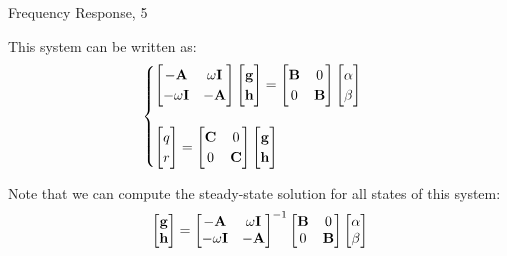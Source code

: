 \documentclass{beamer}
\begin{document}
\begin{frame}{Frequency Response, 5}
	\begin{flushleft}
		
		This system can be written as:
		\begin{align}
			\begin{cases}
				\begin{bmatrix}
					-\mathbf{A} & \omega \mathbf{I} \\
					-\omega \mathbf{I} & -\mathbf{A}
				\end{bmatrix}
				\begin{bmatrix}
					\mathbf{g} \\ \mathbf{h}
				\end{bmatrix}
				=
				\begin{bmatrix}
					\mathbf{B} & 0 \\  0 & \mathbf{B}
				\end{bmatrix}
				\begin{bmatrix}
				\alpha \\   \beta
				\end{bmatrix}
				\\
				\\
				\begin{bmatrix}
					q \\  r
				\end{bmatrix}
				= 
				\begin{bmatrix}
					\mathbf{C} & 0 \\  0 & \mathbf{C}
				\end{bmatrix}
				\begin{bmatrix}
				\mathbf{g} \\ \mathbf{h}
				\end{bmatrix}
			\end{cases}
		\end{align}		
		
		Note that we can compute the steady-state solution for all states of this system:
		\begin{align}
			\begin{bmatrix}
				\mathbf{g} \\ \mathbf{h}
			\end{bmatrix}
			= 
				\begin{bmatrix}
					-\mathbf{A} & \omega \mathbf{I} \\
					-\omega \mathbf{I} & -\mathbf{A}
				\end{bmatrix}^{-1}
				\begin{bmatrix}
					\mathbf{B} & 0 \\  0 & \mathbf{B}
				\end{bmatrix}
				\begin{bmatrix}
					\alpha \\   \beta
				\end{bmatrix}
		\end{align}		
		

\end{flushleft}
\end{frame}
\end{document}
